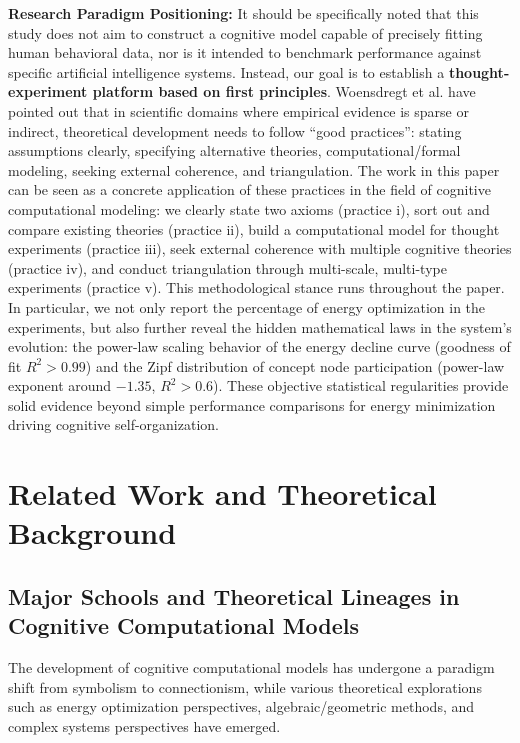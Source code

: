 \documentclass[10pt,onecolumn]{article}
\begin{document}
\textbf{Research Paradigm Positioning:} It should be specifically noted that this study does not aim to construct a cognitive model capable of precisely fitting human behavioral data, nor is it intended to benchmark performance against specific artificial intelligence systems. Instead, our goal is to establish a \textbf{thought-experiment platform based on first principles}. Woensdregt et al. \cite{woensdregt2024lessons} have pointed out that in scientific domains where empirical evidence is sparse or indirect, theoretical development needs to follow “good practices”: stating assumptions clearly, specifying alternative theories, computational/formal modeling, seeking external coherence, and triangulation. The work in this paper can be seen as a concrete application of these practices in the field of cognitive computational modeling: we clearly state two axioms (practice i), sort out and compare existing theories (practice ii), build a computational model for thought experiments (practice iii), seek external coherence with multiple cognitive theories (practice iv), and conduct triangulation through multi-scale, multi-type experiments (practice v). This methodological stance runs throughout the paper. In particular, we not only report the percentage of energy optimization in the experiments, but also further reveal the hidden mathematical laws in the system’s evolution: the power-law scaling behavior of the energy decline curve (goodness of fit \(R^2 > 0.99\)) and the Zipf distribution of concept node participation (power-law exponent around \(-1.35\), \(R^2 > 0.6\)). These objective statistical regularities provide solid evidence beyond simple performance comparisons for energy minimization driving cognitive self-organization.

\section{Related Work and Theoretical Background}

\subsection{Major Schools and Theoretical Lineages in Cognitive Computational Models}

The development of cognitive computational models has undergone a paradigm shift from symbolism to connectionism, while various theoretical explorations such as energy optimization perspectives, algebraic/geometric methods, and complex systems perspectives have emerged.
\end{document}
